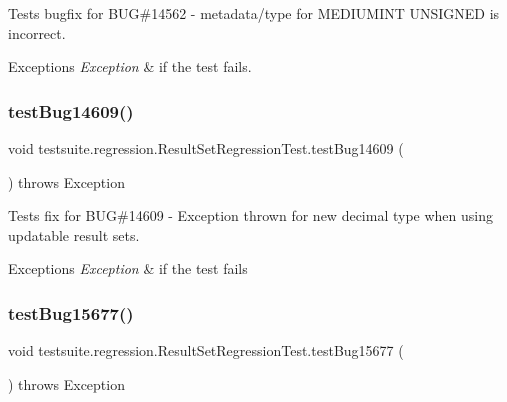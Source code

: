 Tests bugfix for B\+UG\#14562 -\/ metadata/type for M\+E\+D\+I\+U\+M\+I\+NT U\+N\+S\+I\+G\+N\+ED is incorrect.


\begin{DoxyExceptions}{Exceptions}
{\em Exception} & if the test fails. \\
\hline
\end{DoxyExceptions}
\mbox{\label{classtestsuite_1_1regression_1_1_result_set_regression_test_a7fc922fe83b42cb83638138be9f5ac4c}} 
\subsubsection{\texorpdfstring{test\+Bug14609()}{testBug14609()}}
{\footnotesize\ttfamily void testsuite.\+regression.\+Result\+Set\+Regression\+Test.\+test\+Bug14609 (\begin{DoxyParamCaption}{ }\end{DoxyParamCaption}) throws Exception}

Tests fix for B\+UG\#14609 -\/ Exception thrown for new decimal type when using updatable result sets.


\begin{DoxyExceptions}{Exceptions}
{\em Exception} & if the test fails \\
\hline
\end{DoxyExceptions}
\mbox{\label{classtestsuite_1_1regression_1_1_result_set_regression_test_af586d3a65d3b053faa5dd5da4cd5cb15}} 
\subsubsection{\texorpdfstring{test\+Bug15677()}{testBug15677()}}
{\footnotesize\ttfamily void testsuite.\+regression.\+Result\+Set\+Regression\+Test.\+test\+Bug15677 (\begin{DoxyParamCaption}{ }\end{DoxyParamCaption}) throws Exception}

